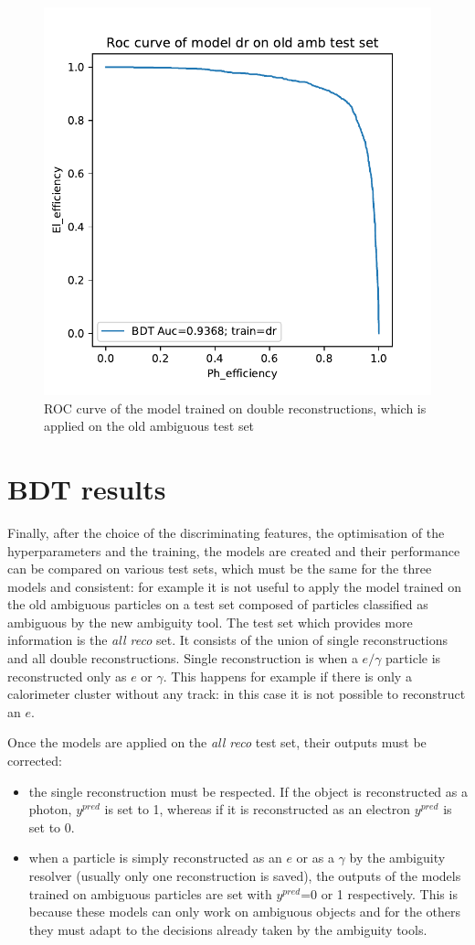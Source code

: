 \documentclass[a4paper, oneside, 11pt, openright]{book}
\begin{document}
			\begin{figure}
				\centering
				\includegraphics[width=.6\linewidth]{tesi_images/dr_old.pdf} 
				\caption{ROC curve of the model trained on double reconstructions, which is applied on the old ambiguous test set} 
				\label{fig:ex_roc}
			\end{figure}
		\section{BDT results}
			Finally, after the choice of the discriminating features, the optimisation of the hyperparameters and the training, the models are created and their performance can be compared on various test sets, which must be the same for the three models and consistent: for example it is not useful to apply the model trained on the old ambiguous particles on a test set composed of particles classified as ambiguous by the new ambiguity tool. The test set which provides more information is the \textit{all reco} set. It consists of the union of single reconstructions and all double reconstructions. Single reconstruction is when a $e/\gamma$ particle is reconstructed only as $e$ or $\gamma$. This happens for example if there is only a calorimeter cluster without any track: in this case it is not possible to reconstruct an $e$.
			
			Once the models are applied on the \textit{all reco} test set, their outputs must be corrected:
			\begin{itemize}
				\item the single reconstruction must be respected. If the object is reconstructed as a photon, $y^{pred}$ is set to 1, whereas if it is reconstructed as an electron $y^{pred}$ is set to 0.
				\item %
				when a particle is simply reconstructed as an $e$ or as a $\gamma$ by the ambiguity resolver (usually only one reconstruction is saved), the outputs of the models trained on ambiguous particles are set with $y^{pred}$=0 or 1 respectively. This is because these models can only work on ambiguous objects and for the others they must adapt to the decisions already taken by the ambiguity tools.
			\end{itemize}
			
\end{document}
